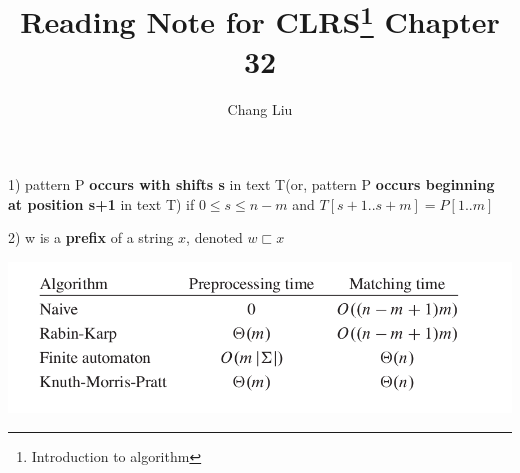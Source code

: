 \documentclass{article}
\author{Chang Liu}
\title{Reading Note for CLRS\footnote{Introduction to algorithm}{ }  Chapter 32}
\begin{document}
\maketitle

1) pattern P \textbf{occurs with shifts s} in text T(or, pattern P \textbf{occurs beginning at position s+1} in text T) if $0\le{s}\le{n-m}$ and $T[s+1..s+m] = P[1..m]$

2) w is a \textbf{prefix} of a string $x$, denoted $w \sqsubset x$ %


\begin{center}
\includegraphics[scale=0.3]{ch32_p1.png}
\end{center}
\end{document}
